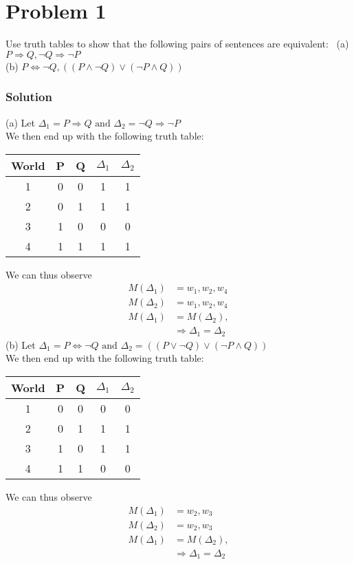 \documentclass{article}
\begin{document}
\section*{Problem 1}
Use truth tables to show that the following pairs of sentences are equivalent: \
\indent (a) $P \Rightarrow Q, \neg Q \Rightarrow \neg P$ \\
\indent (b) $P \Leftrightarrow \neg Q, ((P \land \neg Q) \lor (\neg P \land Q))$
\subsubsection*{Solution}
(a) Let $\Delta_1 = P \Rightarrow Q \mbox{ and } \Delta_2 = \neg Q \Rightarrow \neg P$ \\
We then end up with the following truth table:
\begin{center}\begin{tabular}{ c | c c c c }
World & P & Q & $\Delta_1$ & $\Delta_2$ \\
\hline 
1 & 0 & 0 & 1 & 1 \\
2 & 0 & 1 & 1 & 1 \\
3 & 1 & 0 & 0 & 0 \\
4 & 1 & 1 & 1 & 1 \\
\end{tabular} \end{center}
We can thus observe
\begin{align*}
M(\Delta_1) &= {w_1, w_2, w_4} \\
M(\Delta_2) &= {w_1, w_2, w_4} \\
M(\Delta_1) &= M(\Delta_2), \\ &\Longrightarrow \Delta_1 = \Delta_2
\end{align*}
(b) Let $\Delta_1 = P \Leftrightarrow \neg Q
	\mbox{ and } \Delta_2 = ( (P \lor \neg Q) \lor (\neg P \land Q) )$ \\
We then end up with the following truth table:
\begin{center}\begin{tabular}{ c | c c c c }
World & P & Q & $\Delta_1$ & $\Delta_2$ \\
\hline 
1 & 0 & 0 & 0 & 0 \\
2 & 0 & 1 & 1 & 1 \\
3 & 1 & 0 & 1 & 1 \\
4 & 1 & 1 & 0 & 0 \\
\end{tabular} \end{center}
We can thus observe
\begin{align*}
M(\Delta_1) &= {w_2, w_3} \\
M(\Delta_2) &= {w_2, w_3} \\
M(\Delta_1) &= M(\Delta_2), \\ &\Longrightarrow \Delta_1 = \Delta_2
\end{align*}
\clearpage
\end{document}

